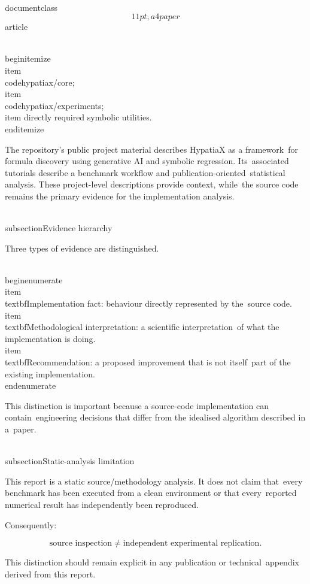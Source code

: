 \\documentclass\[11pt,a4paper\]{article}
\begin{document}
 \\begin{itemize}\
 \\item \\code{hypatiax/core};\
 \\item \\code{hypatiax/experiments};\
 \\item directly required symbolic utilities.\
 \\end{itemize}

 The repository's public project material describes HypatiaX as a framework\
 for formula discovery using generative AI and symbolic regression. Its\
 associated tutorials describe a benchmark workflow and publication-oriented\
 statistical analysis. These project-level descriptions provide context, while\
 the source code remains the primary evidence for the implementation analysis.

 \\subsection{Evidence hierarchy}

 Three types of evidence are distinguished.

 \\begin{enumerate}\
 \\item \\textbf{Implementation fact:} behaviour directly represented by the\
 source code.\
 \\item \\textbf{Methodological interpretation:} a scientific interpretation\
 of what the implementation is doing.\
 \\item \\textbf{Recommendation:} a proposed improvement that is not itself\
 part of the existing implementation.\
 \\end{enumerate}

 This distinction is important because a source-code implementation can contain\
 engineering decisions that differ from the idealised algorithm described in a\
 paper.

 \\subsection{Static-analysis limitation}

 This report is a static source/methodology analysis. It does not claim that\
 every benchmark has been executed from a clean environment or that every\
 reported numerical result has independently been reproduced.

 Consequently:

 $$
\text{source inspection}
\neq
\text{independent experimental replication}.
$$

 This distinction should remain explicit in any publication or technical\
 appendix derived from this report.
\end{document}
